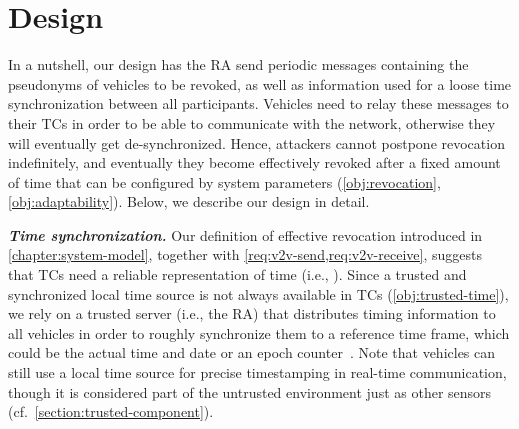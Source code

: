 \section{Design}
\label{chapter:design}

In a nutshell, our design has the \ac{RA} send periodic messages containing the
pseudonyms of vehicles to be revoked, as well as information used for a loose
time synchronization between all participants. Vehicles need to relay these
messages to their \acp{TC} in order to be able to communicate with the network,
otherwise they will eventually get de-synchronized. Hence, attackers cannot
postpone revocation indefinitely, and eventually they become effectively revoked
after a fixed amount of time that can be configured by system parameters
(\ref{obj:revocation}, \ref{obj:adaptability}). Below, we describe our design in
detail.

\noindent\textbf{\emph{Time synchronization.}}
%
Our definition of effective revocation introduced in
\cref{chapter:system-model}, together with \cref{req:v2v-send,req:v2v-receive},
suggests that \acp{TC} need a reliable representation of time (i.e.,
\funcnow{}). Since a trusted and synchronized local time source is not always
available in \acp{TC} (\ref{obj:trusted-time}), we rely on a trusted server
(i.e., the \ac{RA}) that distributes timing information to all vehicles in order
to roughly synchronize them to a reference time frame, which could be the actual
time and date or an epoch counter~\cite{ietfepochs}. Note that vehicles can
still use a local time source for precise timestamping in real-time
communication, though it is considered part of the untrusted environment just as
other sensors (cf.~\cref{section:trusted-component}).

